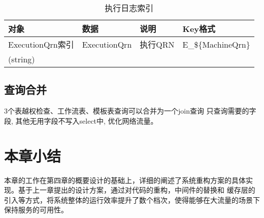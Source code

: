     \begin{table}[H]
        \centering
        \caption{执行日志索引}
        \label{tab:key-log-index}
        \begin{tabular}{lp{10em}ll}
            \toprule
            对象   & 数据               & 说明 & Key格式 \\
            \midrule
            ExecutionQrn索引 & ExecutionQrn    & 执行QRN    & E\_\$\{MachineQrn\} \\
            (string) &&& \\
            \bottomrule
        \end{tabular}
    \end{table}

\subsection{查询合并}
3个表越权检查、工作流表、模板表查询可以合并为一个join查询
只查询需要的字段, 其他无用字段不写入select中, 优化网络流量。


\section{本章小结}
本章的工作在第四章的概要设计的基础上，详细的阐述了系统重构方案的具体实现。基于上一章提出的设计方案，通过对代码的重构，中间件的替换和
缓存层的引入等方式，将系统整体的运行效率提升了数个档次，使得能够在大流量的场景下保持服务的可用性。
